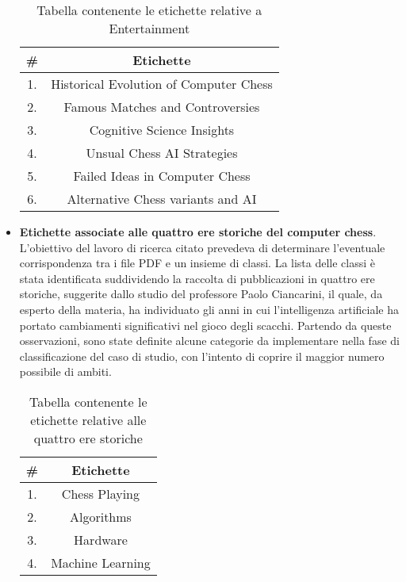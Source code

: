 \begin{itemize}
    \begin{table}[H]
        \centering
        \begin{tabular}{|c|c|}
            \hline
            \small \textbf{\#} & \small \textbf{Etichette} \\
            \hline
            \small 1. & \small Historical Evolution of Computer Chess \\
            \hline
            \small 2. & \small Famous Matches and Controversies \\
            \hline
            \small 3. & \small Cognitive Science Insights \\
            \hline
            \small 4. & \small Unsual Chess AI Strategies \\
            \hline
            \small 5. & \small Failed Ideas in Computer Chess \\
            \hline
            \small 6. & \small Alternative Chess variants and AI \\
            \hline
        \end{tabular}
        \caption{Tabella contenente le etichette relative a Entertainment}
    \end{table}
    \item \textbf{Etichette associate alle quattro ere storiche del computer chess}. \\
    L'obiettivo del lavoro di ricerca citato prevedeva di determinare l'eventuale corrispondenza tra i file PDF e un insieme di classi. La lista delle classi è stata identificata suddividendo la raccolta di pubblicazioni in quattro ere storiche, suggerite dallo studio del professore Paolo Ciancarini, il quale, da esperto della materia, ha individuato gli anni in cui l'intelligenza artificiale ha portato cambiamenti significativi nel gioco degli scacchi. Partendo da queste osservazioni, sono state definite alcune categorie da implementare nella fase di classificazione del caso di studio, con l'intento di coprire il maggior numero possibile di ambiti.
    \begin{table}[H]
        \centering
        \begin{tabular}{|c|c|}
            \hline
            \small \textbf{\#} & \small \textbf{Etichette} \\
            \hline
            \small 1. & \small Chess Playing \\
            \hline
            \small 2. & \small Algorithms \\
            \hline
            \small 3. & \small Hardware \\
            \hline
            \small 4. & \small Machine Learning \\
            \hline
        \end{tabular}
        \caption{Tabella contenente le etichette relative alle quattro ere storiche}
    \end{table}
\end{itemize}